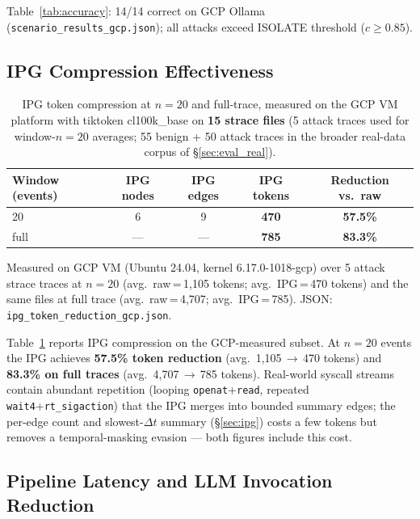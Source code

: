 \documentclass[journal]{IEEEtran}
\begin{document}
Table~\ref{tab:accuracy}: 14/14 correct on GCP Ollama (\texttt{scenario\_results\_gcp.json});
all attacks exceed ISOLATE threshold ($c \geq 0.85$).

\subsection{IPG Compression Effectiveness}

\begin{table}[!t]
\caption{IPG token compression at $n{=}20$ and full-trace, measured on the GCP VM
platform with tiktoken cl100k\_base on \textbf{15 strace files} (5 attack traces
used for window-$n{=}20$ averages; 55 benign + 50 attack traces in the broader
real-data corpus of \S\ref{sec:eval_real}).}
\label{tab:compression}
\centering
\footnotesize
\renewcommand{\arraystretch}{1.1}
\begin{tabular}{@{}lcccc@{}}
\toprule
\textbf{Window (events)} & \textbf{IPG nodes} & \textbf{IPG edges} & \textbf{IPG tokens} & \textbf{Reduction vs.\ raw} \\
\midrule
20 & 6  & 9  & \textbf{470} & \textbf{57.5\%} \\
full & --- & --- & \textbf{785} & \textbf{83.3\%} \\
\bottomrule
\end{tabular}
\vspace{2pt}
{\scriptsize Measured on GCP VM (Ubuntu 24.04, kernel 6.17.0-1018-gcp) over
5 attack strace traces at $n{=}20$ (avg.\ raw\,=\,1{,}105 tokens;
avg.\ IPG\,=\,470 tokens) and the same files at full trace (avg.\ raw\,=\,4{,}707;
avg.\ IPG\,=\,785). JSON: \texttt{ipg\_token\_reduction\_gcp.json}.}
\end{table}

Table~\ref{tab:compression} reports IPG compression on the GCP-measured subset.
At $n\!=\!20$ events the IPG achieves \textbf{57.5\% token reduction} (avg.\
1{,}105\,$\to$\,470 tokens) and \textbf{83.3\% on full traces} (avg.\
4{,}707\,$\to$\,785 tokens).
Real-world syscall streams contain abundant repetition (looping
\texttt{openat}+\texttt{read}, repeated \texttt{wait4}+\texttt{rt\_sigaction})
that the IPG merges into bounded summary edges; the per-edge count and
slowest-$\Delta t$ summary (\S\ref{sec:ipg}) costs a few tokens but removes a
temporal-masking evasion --- both figures include this cost.

\subsection{Pipeline Latency and LLM Invocation Reduction}\label{sec:eval_latency}
\end{document}
